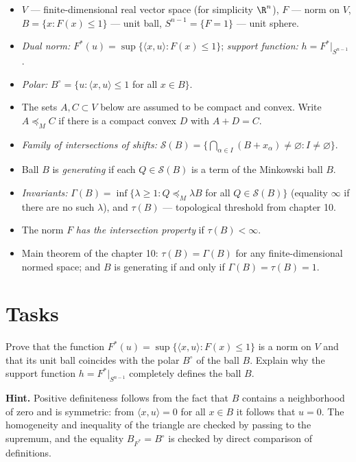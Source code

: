 \documentclass[a4paper,12pt]{report}
\begin{document}
\begin{itemize}[leftmargin=*]
\item $V$ --- finite-dimensional real vector space (for simplicity $\R^n$), $F$ --- norm on $V$, $B=\{x: F(x)\le1\}$ --- unit ball, $S^{n-1}=\{F=1\}$ --- unit sphere.
\item \emph{Dual norm\textup{:}} $F^*(u)=\sup\{\langle x,u\rangle: F(x)\le1\}$\textup{;} \emph{support function\textup{:}} $h=F^*|_{S^{n-1}}$.
\item \emph{Polar\textup{:}} $B^\circ=\{u: \langle x,u\rangle\le1$ for all $x\in B\}$.
\item The sets $A,C\subset V$ below are assumed to be compact and convex. Write $A\preceq_M C$ if there is a compact convex $D$ with $A+D=C$.
\item \emph{Family of intersections of shifts\textup{:}} $\mathcal S(B)=\bigl\{\bigcap_{\alpha\in I}(B+x_\alpha)\ne\varnothing: I\ne\varnothing\bigr\}$.
\item Ball $B$ is \emph{generating} if each $Q\in\mathcal S(B)$ is a term of the Minkowski ball $B$.
\item \emph{Invariants\textup{:}} $\Gamma(B)=\inf\{\lambda\ge1: Q\preceq_M\lambda B$ for all $Q\in\mathcal S(B)\}$ (equality $\infty$ if there are no such $\lambda$), and $\tau(B)$ --- topological threshold from chapter \textup{10}.
\item The norm $F$ \emph{has the intersection property} if $\tau(B)<\infty$.
\item Main theorem of the chapter \textup{10}\textup{:} $\tau(B)=\Gamma(B)$ for any finite-dimensional normed space\textup{;} and $B$ is generating if and only if $\Gamma(B)=\tau(B)=1$.
\end{itemize}

\section*{Tasks}

\begin{task}
Prove that the function $F^*(u)=\sup\{\langle x,u\rangle: F(x)\le1\}$ is a norm on $V$ and that its unit ball coincides with the polar $B^\circ$ of the ball $B$. Explain why the support function $h=F^*|_{S^{n-1}}$ completely defines the ball $B$.

\textbf{Hint.} Positive definiteness follows from the fact that $B$ contains a neighborhood of zero and is symmetric\textup{:} from $\langle x,u\rangle=0$ for all $x\in B$ it follows that $u=0$. The homogeneity and inequality of the triangle are checked by passing to the supremum, and the equality $B_{F^*}=B^\circ$ is checked by direct comparison of definitions.
\end{task}
\end{document}
